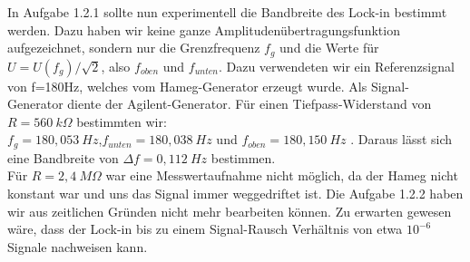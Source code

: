\documentclass{scrartcl}						%
\begin{document}
			 In Aufgabe 1.2.1 sollte nun experimentell die Bandbreite des Lock-in bestimmt werden.
			 Dazu haben wir keine ganze Amplitudenübertragungsfunktion aufgezeichnet, sondern nur die Grenzfrequenz $ f_{g} $ und die Werte für $ U=U(f_{g})/\sqrt{2}$, also $ f_{oben} $ und $ f_{unten} $. Dazu verwendeten wir ein Referenzsignal von f=180Hz, welches vom Hameg-Generator erzeugt wurde. Als Signal-Generator diente der Agilent-Generator.
			 Für einen Tiefpass-Widerstand von $ R=560 \ k\Omega $ bestimmten wir: \\
			 $ f_{g}=180,053 \ Hz$,$f_{unten}=180,038 \ Hz $ und $f_{oben}=180,150 \ Hz$ .
			 Daraus lässt sich eine Bandbreite von $ \Delta f = 0,112 \ Hz$ bestimmen.\\
			 Für $ R=2,4 \ M\Omega$ war eine Messwertaufnahme nicht möglich, da der Hameg nicht konstant war und uns das Signal immer weggedriftet ist.
			 \newline
			 Die Aufgabe 1.2.2 haben wir aus zeitlichen Gründen nicht mehr bearbeiten können. Zu erwarten gewesen wäre, dass der Lock-in bis zu einem Signal-Rausch Verhältnis von etwa $ 10^{-6} $ Signale nachweisen kann.
			
\end{document}
